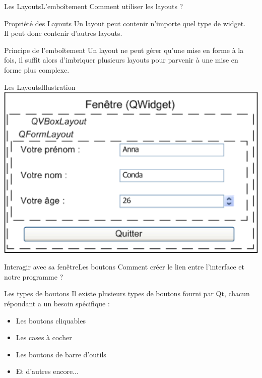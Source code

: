 \documentclass[12pt]{beamer}
\begin{document}
            \begin{frame}{Les Layouts}{L'emboîtement}
                Comment utiliser les layouts ?
                \begin{block}{Propriété des Layouts}   
                    Un layout peut contenir n'importe quel type de widget.\\Il peut donc contenir d'autres layouts.
                \end{block}
                \begin{block}{Principe de l'emboîtement}
                    Un layout ne peut gérer qu'une mise en forme à la fois, il suffit alors d'imbriquer plusieurs layouts pour parvenir à une mise en forme plus complexe.
                \end{block}
            \end{frame}
            
                            
            \begin{frame}{Les Layouts}{Illustration}
            \includegraphics[width=1\textwidth]{pictures/Layout.png}
            \end{frame}
            
            \begin{frame}{Interagir avec sa fenêtre}{Les boutons}
                Comment créer le lien entre l'interface et notre programme ?
                \begin{block}{Les types de boutons}
                    Il existe plusieurs types de boutons fourni par Qt, chacun répondant a un besoin spécifique :
                    \begin{itemize}
                    \item{Les boutons cliquables}
                    \item{Les cases à cocher}
                    \item{Les boutons de barre d'outils}
                    \item{Et d'autres encore...}
                    \end{itemize}
                \end{block}
            \end{frame}
            
\end{document}
